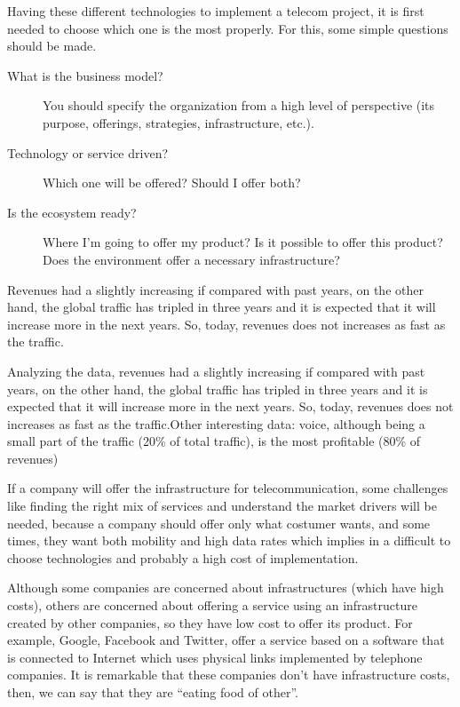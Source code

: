 \documentclass[a4paper,11pt]{article}
\begin{document}
Having these different technologies to implement a telecom project, it is first needed to choose which one is the  most properly. For this, some simple questions should be made.

\begin{description}
\item[What is the business model?]  You should specify the organization from a
  high level of perspective (its purpose, offerings, strategies, infrastructure, etc.).
\item[Technology or service driven?] Which one will be offered? Should I offer both?
\item[Is  the ecosystem  ready?] Where  I'm  going to  offer my  product? Is  it
  possible to offer this product? Does the environment offer a necessary
    infrastructure?
\end{description}

Revenues had  a slightly increasing  if compared with  past years, on  the other
hand, the global traffic  has tripled in three years and it  is expected that it
will increase more in the next  years. So, today, revenues does not increases as
fast as the traffic.

Analyzing the  data, revenues  had a slightly  increasing if compared  with past
years, on the other  hand, the global traffic has tripled in  three years and it
is expected  that it will increase more  in the next years.  So, today, revenues
does not increases as fast as the traffic.Other interesting data: voice, although being a small part of the traffic
(20\% of total traffic), is the most profitable (80\% of revenues)

If a company will offer the infrastructure for telecommunication, some challenges
like finding the right mix of services and understand the market drivers will be
needed, because a company should offer only what costumer wants, and some times,
they want  both mobility  and high data  rates which  implies in a  difficult to
choose technologies and probably a high cost of implementation.

Although some companies are concerned about infrastructures (which have high costs), others are concerned
about offering a service using  an infrastructure created by other companies, so
they have low cost to offer its product.
For example,  Google, Facebook and Twitter, offer a service based on  a  software that  is connected  to
Internet which  uses   physical  links   implemented  by   telephone
companies. It is  remarkable that these companies don't  have infrastructure
costs, then, we can say that they are ``eating food of other''.
\end{document}
